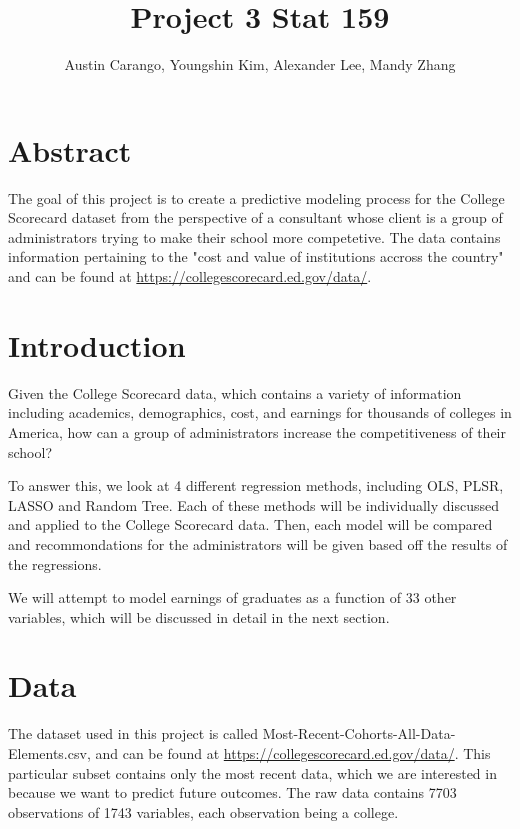 \documentclass{article}
\title{Project 3 Stat 159}
\author{Austin Carango, Youngshin Kim, Alexander Lee, Mandy Zhang}
\begin{document}

\maketitle

\section{Abstract}

The goal of this project is to create a predictive modeling process for the College Scorecard dataset from the perspective of a consultant whose client is a group of administrators trying to make their school more competetive. The data contains information pertaining to the "cost and value of institutions accross the country" and can be found at \url{https://collegescorecard.ed.gov/data/}.



\section{Introduction}

Given the College Scorecard data, which contains a variety of information including academics, demographics, cost, and earnings for thousands of colleges in America, how can a group of administrators increase the competitiveness of their school?

To answer this, we look at 4 different regression methods, including OLS, PLSR, LASSO and Random Tree. Each of these methods will be individually discussed and applied to the College Scorecard data. Then, each model will be compared and recommondations for the administrators will be given based off the results of the regressions.

We will attempt to model earnings of graduates as a function of 33 other variables, which will be discussed in detail in the next section. 


\section{Data}

The dataset used in this project is called Most-Recent-Cohorts-All-Data-Elements.csv, and can be found at \url{https://collegescorecard.ed.gov/data/}. This particular subset contains only the most recent data, which we are interested in because we want to predict future outcomes. The raw data contains 7703 observations of 1743 variables, each observation being a college.
\end{document}
